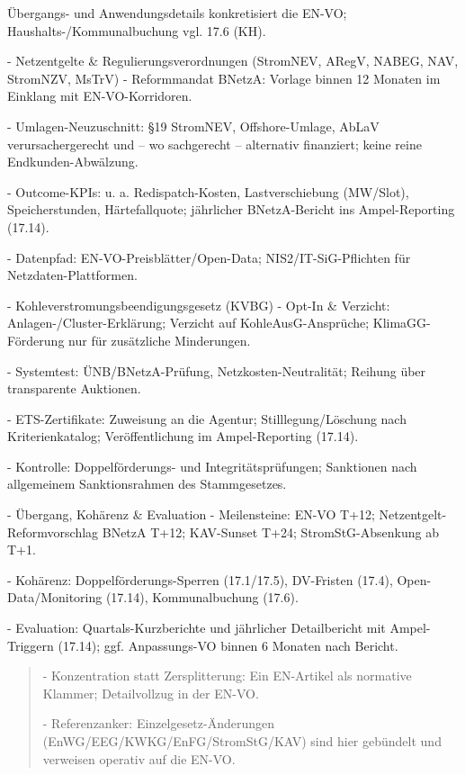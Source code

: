 \documentclass[12pt,a4paper]{scrartcl}
\begin{document}
Übergangs- und Anwendungsdetails konkretisiert die EN-VO; Haushalts-/Kommunalbuchung vgl. 17.6 (KH).

- Netzentgelte \& Regulierungsverordnungen (StromNEV, ARegV, NABEG, NAV, StromNZV, MsTrV)
- Reformmandat BNetzA: Vorlage binnen 12 Monaten im Einklang mit EN-VO-Korridoren.

- Umlagen-Neuzuschnitt: §19 StromNEV, Offshore-Umlage, AbLaV verursachergerecht und -- wo sachgerecht -- alternativ finanziert; keine reine Endkunden-Abwälzung.

- Outcome-KPIs: u. a. Redispatch-Kosten, Lastverschiebung (MW/Slot), Speicherstunden, Härtefallquote; jährlicher BNetzA-Bericht ins Ampel-Reporting (17.14).

- Datenpfad: EN-VO-Preisblätter/Open-Data; NIS2/IT-SiG-Pflichten für Netzdaten-Plattformen.

- Kohleverstromungsbeendigungsgesetz (KVBG)
- Opt-In \& Verzicht: Anlagen-/Cluster-Erklärung; Verzicht auf KohleAusG-Ansprüche; KlimaGG-Förderung nur für zusätzliche Minderungen.

- Systemtest: ÜNB/BNetzA-Prüfung, Netzkosten-Neutralität; Reihung über transparente Auktionen.

- ETS-Zertifikate: Zuweisung an die Agentur; Stilllegung/Löschung nach Kriterienkatalog; Veröffentlichung im Ampel-Reporting (17.14).

- Kontrolle: Doppelförderungs- und Integritätsprüfungen; Sanktionen nach allgemeinem Sanktionsrahmen des Stammgesetzes.

- Übergang, Kohärenz \& Evaluation
- Meilensteine: EN-VO T+12; Netzentgelt-Reformvorschlag BNetzA T+12; KAV-Sunset T+24; StromStG-Absenkung ab T+1.

- Kohärenz: Doppelförderungs-Sperren (17.1/17.5), DV-Fristen (17.4), Open-Data/Monitoring (17.14), Kommunalbuchung (17.6).

- Evaluation: Quartals-Kurzberichte und jährlicher Detailbericht mit Ampel-Triggern (17.14); ggf. Anpassungs-VO binnen 6 Monaten nach Bericht.

{\footnotesize\begin{quote}
- Konzentration statt Zersplitterung: Ein EN-Artikel als normative Klammer; Detailvollzug in der EN-VO.

- Referenzanker: Einzelgesetz-Änderungen (EnWG/EEG/KWKG/EnFG/StromStG/KAV) sind hier gebündelt und verweisen operativ auf die EN-VO.
\end{quote}}
\end{document}
